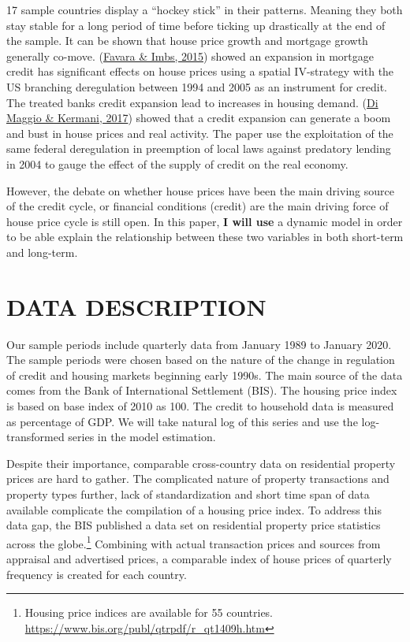 \documentclass[
  12pt,
]{article}
\begin{document}
17 sample countries display a ``hockey stick'' in their patterns. Meaning they both stay stable for a long period of time before ticking up drastically at the end of the sample. It can be shown that house price growth and mortgage growth generally co-move. (\protect\hyperlink{ref-favara_credit_2015}{Favara \& Imbs, 2015}) showed an expansion in mortgage credit has significant effects on house prices using a spatial IV-strategy with the US branching deregulation between 1994 and 2005 as an instrument for credit. The treated banks credit expansion lead to increases in housing demand. (\protect\hyperlink{ref-di_maggio_credit-induced_2017}{Di Maggio \& Kermani, 2017}) showed that a credit expansion can generate a boom and bust in house prices and real activity. The paper use the exploitation of the same federal deregulation in preemption of local laws against predatory lending in 2004 to gauge the effect of the supply of credit on the real economy.

However, the debate on whether house prices have been the main driving source of the credit cycle, or financial conditions (credit) are the main driving force of house price cycle is still open. In this paper, \textbf{I will use} a dynamic model in order to be able explain the relationship between these two variables in both short-term and long-term.

\hypertarget{data-description}{%
\section{DATA DESCRIPTION}\label{data-description}}

Our sample periods include quarterly data from January 1989 to January 2020. The sample periods were chosen based on the nature of the change in regulation of credit and housing markets beginning early 1990s. The main source of the data comes from the Bank of International Settlement (BIS). The housing price index is based on base index of 2010 as 100. The credit to household data is measured as percentage of GDP. We will take natural log of this series and use the log-transformed series in the model estimation.

Despite their importance, comparable cross-country data on residential property prices are hard to gather. The complicated nature of property transactions and property types further, lack of standardization and short time span of data available complicate the compilation of a housing price index. To address this data gap, the BIS published a data set on residential property price statistics across the globe.\footnote{Housing price indices are available for 55 countries. \url{https://www.bis.org/publ/qtrpdf/r_qt1409h.htm}} Combining with actual transaction prices and sources from appraisal and advertised prices, a comparable index of house prices of quarterly frequency is created for each country.
\end{document}
